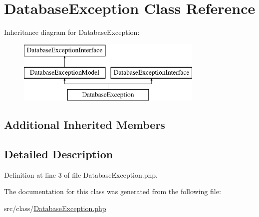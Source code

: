 \hypertarget{class_database_exception}{}\section{Database\+Exception Class Reference}
\label{class_database_exception}
Inheritance diagram for Database\+Exception\+:\begin{figure}[H]
\begin{center}
\leavevmode
\includegraphics[height=3.000000cm]{class_database_exception}
\end{center}
\end{figure}
\subsection*{Additional Inherited Members}


\subsection{Detailed Description}


Definition at line 3 of file Database\+Exception.\+php.



The documentation for this class was generated from the following file\+:\begin{DoxyCompactItemize}
\item 
src/class/\hyperlink{_database_exception_8php}{Database\+Exception.\+php}\end{DoxyCompactItemize}
